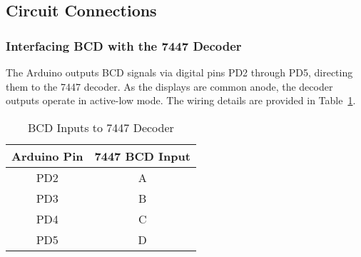 \documentclass[a4paper,12pt]{article}
\begin{document}
\subsection{Circuit Connections}
\subsubsection{Interfacing BCD with the 7447 Decoder}
The Arduino outputs BCD signals via digital pins PD2 through PD5, directing them to the 7447 decoder. As the displays are common anode, the decoder outputs operate in active-low mode. The wiring details are provided in Table~\ref{tab:decoder}.

\begin{table}[H]
    \centering
    \begin{tabular}{|c|c|}
        \hline
        \textbf{Arduino Pin} & \textbf{7447 BCD Input} \\
        \hline
        PD2 & A \\
        PD3 & B \\
        PD4 & C \\
        PD5 & D \\
        \hline
    \end{tabular}
    \caption{BCD Inputs to 7447 Decoder}
    \label{tab:decoder}
\end{table}
\end{document}
